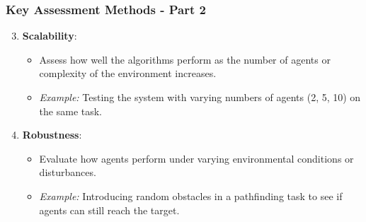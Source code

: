 \documentclass[aspectratio=169]{beamer}
\begin{document}
\begin{frame}[fragile]
    \frametitle{Key Assessment Methods - Part 2}
    \begin{enumerate}
        \setcounter{enumi}{2} %
        \item \textbf{Scalability}:
            \begin{itemize}
                \item Assess how well the algorithms perform as the number of agents or complexity of the environment increases.
                \item \textit{Example:} Testing the system with varying numbers of agents (2, 5, 10) on the same task.
            \end{itemize}

        \item \textbf{Robustness}:
            \begin{itemize}
                \item Evaluate how agents perform under varying environmental conditions or disturbances.
                \item \textit{Example:} Introducing random obstacles in a pathfinding task to see if agents can still reach the target.
            \end{itemize}
    \end{enumerate}
\end{frame}
\end{document}
